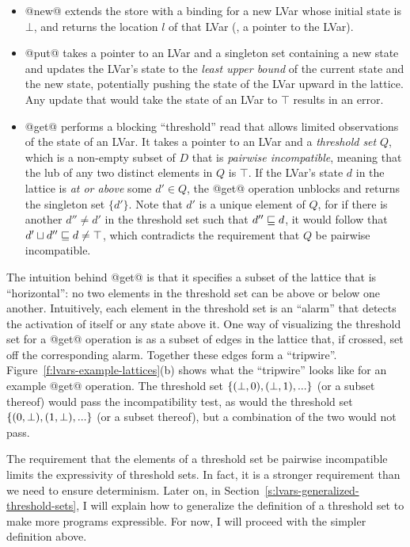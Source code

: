 \begin{itemize}
\item @new@ extends the store with a binding for a new LVar whose
  initial state is $\bot$, and returns the location $l$ of that LVar
  (\ie, a pointer to the LVar).
\item @put@ takes a pointer to an LVar and a singleton set containing
  a new state and updates the LVar's state to the \emph{least upper
    bound} of the current state and the new state, potentially pushing
  the state of the LVar upward in the lattice.  Any update that would
  take the state of an LVar to $\top$ results in an error.
\item @get@ performs a blocking ``threshold'' read that allows
  limited observations of the state of an LVar.  It takes a pointer to
  an LVar and a \emph{threshold set} $Q$, which is a non-empty subset
  of $D$ that is \emph{pairwise incompatible}, meaning that the lub of
  any two distinct elements in $Q$ is $\top$.  If the LVar's state $d$
  in the lattice is \emph{at or above} some $d' \in Q$, the @get@
  operation unblocks and returns the singleton set $\lbrace d'
  \rbrace$.  Note that $d'$ is a unique element of $Q$, for if there
  is another $d'' \neq d'$ in the threshold set such that $d''
  \sqsubseteq d$, it would follow that $d' \sqcup d'' \sqsubseteq d \neq
  \top$, which contradicts the requirement that $Q$ be pairwise
  incompatible.
\end{itemize}

The intuition behind @get@ is that it specifies a subset of the
lattice that is ``horizontal'': no two elements in the threshold set
can be above or below one another.  Intuitively, each element in the
threshold set is an ``alarm'' that detects the activation of itself or
any state above it.  One way of visualizing the threshold set for a
@get@ operation is as a subset of edges in the lattice that, if
crossed, set off the corresponding alarm.  Together these edges form a
``tripwire''.  Figure~\ref{f:lvars-example-lattices}(b) shows what the
``tripwire'' looks like for an example @get@ operation.  The
threshold set $\lbrace (\bot, 0), (\bot, 1), ... \rbrace$ (or a subset
thereof) would pass the incompatibility test, as would the threshold
set $\lbrace (0, \bot), (1, \bot), ... \rbrace$ (or a subset thereof), but
a combination of the two would not pass.

The requirement that the elements of a threshold set be pairwise
incompatible limits the expressivity of threshold sets.  In fact, it
is a stronger requirement than we need to ensure determinism.  Later
on, in Section~\ref{s:lvars-generalized-threshold-sets}, I will
explain how to generalize the definition of a threshold set to make
more programs expressible.  For now, I will proceed with the simpler
definition above.

